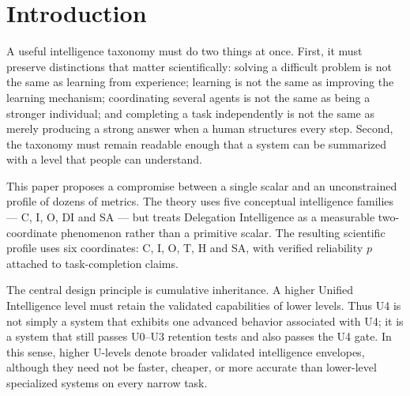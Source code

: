 \documentclass[11pt]{article}
\theoremstyle{definition}
\begin{document}
\begin{abstract}
\medskip
\noindent\textbf{Keywords:} unified intelligence, AGI levels, cognitive intelligence, individual intelligence, organizational intelligence, delegation intelligence, self-awareness, task difficulty, human intervention, harness architecture, recursive self-improvement, harness intelligence level, harness-LLM score, harnessability, benchmark ladder, harness scaling curve, long-term memory, episodic memory, semantic consolidation, procedural memory, benchmark validity, answer-key defects, cross-tier concordance, item saturation, graded scoring
\end{abstract}

\tableofcontents
\bigskip

\section{Introduction}

A useful intelligence taxonomy must do two things at once. First, it must preserve distinctions that matter scientifically: solving a difficult problem is not the same as learning from experience; learning is not the same as improving the learning mechanism; coordinating several agents is not the same as being a stronger individual; and completing a task independently is not the same as merely producing a strong answer when a human structures every step. Second, the taxonomy must remain readable enough that a system can be summarized with a level that people can understand.

This paper proposes a compromise between a single scalar and an unconstrained profile of dozens of metrics. The theory uses five conceptual intelligence families --- C, I, O, DI and SA --- but treats Delegation Intelligence as a measurable two-coordinate phenomenon rather than a primitive scalar. The resulting scientific profile uses six coordinates: C, I, O, T, H and SA, with verified reliability $p$ attached to task-completion claims.

The central design principle is cumulative inheritance. A higher Unified Intelligence level must retain the validated capabilities of lower levels. Thus U4 is not simply a system that exhibits one advanced behavior associated with U4; it is a system that still passes U0--U3 retention tests and also passes the U4 gate. In this sense, higher U-levels denote broader validated intelligence envelopes, although they need not be faster, cheaper, or more accurate than lower-level specialized systems on every narrow task.
\end{document}
